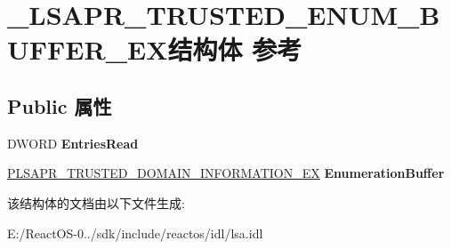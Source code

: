 \hypertarget{struct___l_s_a_p_r___t_r_u_s_t_e_d___e_n_u_m___b_u_f_f_e_r___e_x}{}\section{\+\_\+\+L\+S\+A\+P\+R\+\_\+\+T\+R\+U\+S\+T\+E\+D\+\_\+\+E\+N\+U\+M\+\_\+\+B\+U\+F\+F\+E\+R\+\_\+\+E\+X结构体 参考}
\label{struct___l_s_a_p_r___t_r_u_s_t_e_d___e_n_u_m___b_u_f_f_e_r___e_x}
\subsection*{Public 属性}
\begin{DoxyCompactItemize}
\item 
\mbox{\label{struct___l_s_a_p_r___t_r_u_s_t_e_d___e_n_u_m___b_u_f_f_e_r___e_x_a6b69a0db9368594b25da22241f810a45}} 
D\+W\+O\+RD {\bfseries Entries\+Read}
\item 
\mbox{\label{struct___l_s_a_p_r___t_r_u_s_t_e_d___e_n_u_m___b_u_f_f_e_r___e_x_a731adcab5ef67d0dff35eda18efe1d4e}} 
\hyperlink{struct___l_s_a_p_r___t_r_u_s_t_e_d___d_o_m_a_i_n___i_n_f_o_r_m_a_t_i_o_n___e_x}{P\+L\+S\+A\+P\+R\+\_\+\+T\+R\+U\+S\+T\+E\+D\+\_\+\+D\+O\+M\+A\+I\+N\+\_\+\+I\+N\+F\+O\+R\+M\+A\+T\+I\+O\+N\+\_\+\+EX} {\bfseries Enumeration\+Buffer}
\end{DoxyCompactItemize}


该结构体的文档由以下文件生成\+:\begin{DoxyCompactItemize}
\item 
E\+:/\+React\+O\+S-\/0../sdk/include/reactos/idl/lsa.\+idl\end{DoxyCompactItemize}
